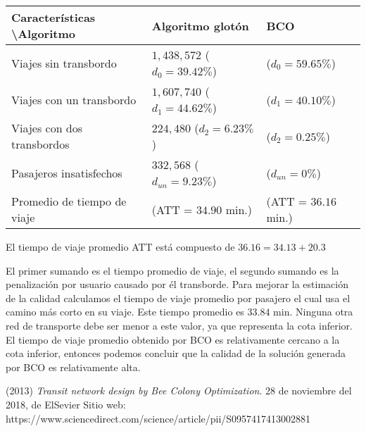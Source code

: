\documentclass[letterpaper,12pt]{article}
\begin{document}
\begin{table}[tph!]
        \begin{tabular}{|l|l|l|}
        \hline
        \rowcolor[HTML]{DAE8FC} 
        Características \textbackslash Algoritmo & Algoritmo glotón              & BCO                  \\ \hline
        Viajes sin transbordo                    & $1,438,572$ ($d_0 = 39.42\%$) & ($d_0 = 59.65\%$)    \\ \hline
        Viajes con un transbordo                 & $1,607,740$ ($d_1 = 44.62\%$) & ($d_1 = 40.10\%$)    \\ \hline
        Viajes con dos transbordos               & $224,480$ ($d_2 = 6.23\%$)    & ($d_2 = 0.25\%$)     \\ \hline
        Pasajeros insatisfechos                  & $332,568$ ($d_{un} = 9.23\%$) & ($d_{un} = 0\%$)     \\ \hline
        Promedio de tiempo de viaje              & (ATT = $34.90$ min.)          & (ATT = $36.16$ min.) \\ \hline
        \end{tabular}
    \end{table}

El tiempo de viaje promedio ATT está compuesto de $36.16 = 34.13 + 20.3$

El primer sumando es el tiempo promedio de viaje, el segundo sumando es la 
penalización por usuario causado por él transborde. Para mejorar la estimación 
de la calidad calculamos el tiempo de viaje promedio por pasajero el cual 
usa el camino más corto en su viaje. Este tiempo promedio es $33.84$ min. 
Ninguna otra red de transporte debe ser menor a este valor, ya que representa 
la cota inferior. El tiempo de viaje promedio obtenido por BCO es 
relativamente cercano a la cota inferior, entonces podemos concluir que la 
calidad de la solución generada por BCO es relativamente alta.

\begin{thebibliography}{99}

(2013) \textit{Transit network design by Bee Colony Optimization}. 
28 de noviembre del 2018, de ElSevier 
Sitio web: https://www.sciencedirect.com/science/article/pii/S0957417413002881

\end{thebibliography}
\end{document}
